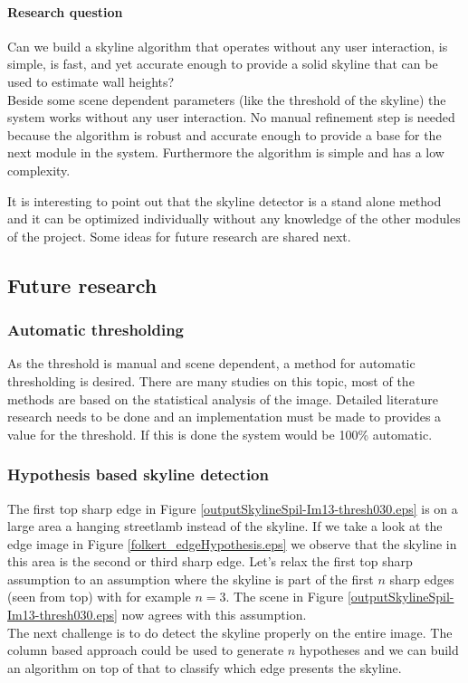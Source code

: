 \paragraph{Research question}
Can we build a skyline algorithm that operates without any user interaction, is
simple, is fast, and yet accurate enough to provide a solid skyline that can be
used to estimate wall heights?\\

Beside some scene dependent parameters (like the threshold of the skyline) the
system works without any user interaction. No manual refinement step is needed
because the algorithm is robust and accurate enough to provide a base for the
next module in the system. Furthermore the algorithm is simple and has a low
complexity. 

It is interesting to point out that the skyline detector is a stand alone method
and it can be optimized individually without any knowledge of the other modules
of the project.  Some ideas for future research are shared next.

\subsection{Future research}
\label{sec:skylinefut}
\subsubsection{Automatic thresholding}
As the threshold is manual and scene dependent, a method for automatic
thresholding is desired. There are many studies on this topic, most of the
methods are based on the statistical analysis of the image. Detailed literature
research needs to be done and an implementation must be made to provides a value
for the threshold. If this is done the system would be 100\% automatic.

\subsubsection{Hypothesis based skyline detection}

The first top sharp edge in Figure \ref{outputSkylineSpil-Im13-thresh030.eps}
is on a large area a hanging streetlamb instead of the skyline.
If we take a look at the edge image in Figure \ref{folkert_edgeHypothesis.eps}
we observe that the skyline in this area is the second or third
sharp edge.
Let's relax the first top sharp assumption to an assumption where the skyline is
part of the first $n$ sharp edges (seen from top) with for example $n=3$.
The scene in Figure \ref{outputSkylineSpil-Im13-thresh030.eps} now agrees with
this assumption.\\
The next challenge is to do detect the skyline properly on the entire image.
The column based approach could be used to generate $n$ hypotheses and we can build
an algorithm on top of that to classify which edge presents the skyline.

